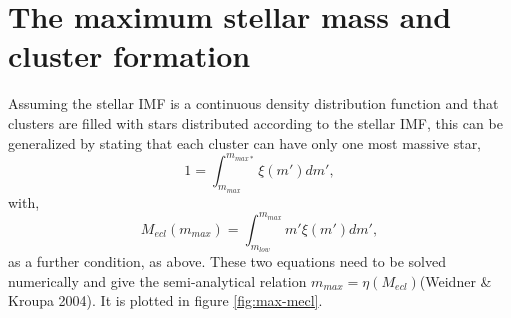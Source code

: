 \section{The maximum stellar mass and cluster formation}
Assuming the stellar IMF is a continuous density distribution function and that
clusters are filled with stars distributed according to the stellar IMF, this can
be generalized by stating that each cluster can have only one most massive star,
\begin{equation}
1=\int_{m_{max}}^{m_{max*}}\xi(m')dm',
\end{equation}
with,
\begin{equation}
M_{ecl}(m_{max})=\int_{m_{low}}^{m_{max}} m' \xi(m')dm',
\end{equation}
as a further condition, as above. These two equations need to be solved numerically and give the semi-analytical relation $ m_{max}= \eta (M_{ecl} )$(Weidner & Kroupa
2004). It is plotted in figure \ref{fig:max-mecl}.
